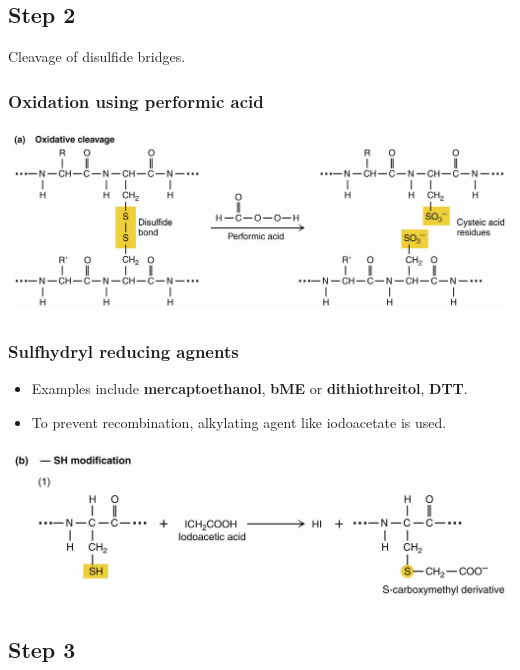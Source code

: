 \documentclass[11pt]{article}
\begin{document}
\newpage

\subsection{Step 2}
\label{sec:org11dc25d}
Cleavage of disulfide bridges.

\subsubsection{Oxidation using performic acid}
\label{sec:orgfcd8c82}
\begin{center}
\includegraphics[width=.9\linewidth]{./images/oxidative-cleavage.png}
\end{center}

\subsubsection{Sulfhydryl reducing agnents}
\label{sec:orgde70935}
\begin{itemize}
\item Examples include \textbf{mercaptoethanol}, \textbf{bME} or \textbf{dithiothreitol}, \textbf{DTT}.
\item To prevent recombination, alkylating agent like iodoacetate is used.
\end{itemize}
\begin{center}
\includegraphics[width=.9\linewidth]{./images/reducing-sulfhydryl.png}
\end{center}

\newpage

\subsection{Step 3}
\label{sec:orged2f7a9}
\end{document}
